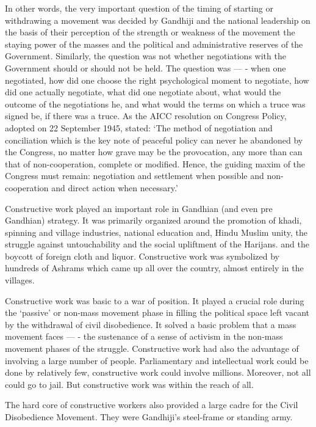 \begin{multicols}{2}
In other words, the very important question of the timing of starting or withdrawing a movement was decided by Gandhiji and the national leadership on the basis of their perception of the strength or weakness of the movement the staying power of the masses and the political and administrative reserves of the Government. Similarly, the question was not whether negotiations with the Government should or should not be held. The question was --- - when one negotiated, how did one choose the right psychological moment to negotiate, how did one actually negotiate, what did one negotiate about, what would the outcome of the negotiations he, and what would the terms on which a truce was signed be, if there was a truce. As the AICC resolution on Congress Policy, adopted on 22 September 1945, stated: `The method of negotiation and conciliation which is the key note of peaceful policy can never he abandoned by the Congress, no matter how grave may be the provocation, any more than can that of non-cooperation, complete or modified. Hence, the guiding maxim of the Congress must remain: negotiation and settlement when possible and non-cooperation and direct action when necessary.'

Constructive work played an important role in Gandhian (and even pre Gandhian) strategy. It was primarily organized around the promotion of khadi, spinning and village industries, national education and, Hindu Muslim unity, the struggle against untouchability and the social upliftment of the Harijans. and the boycott of foreign cloth and liquor. Constructive work was symbolized by hundreds of Ashrams which came up all over the country, almost entirely in the villages.

Constructive work was basic to a war of position. It played a crucial role during the `passive' or non-mass movement phase in filling the political space left vacant by the withdrawal of civil disobedience. It solved a basic problem that a mass movement faces --- - the sustenance of a sense of activism in the non-mass movement phases of the struggle. Constructive work had also the advantage of involving a large number of people. Parliamentary and intellectual work could be done by relatively few, constructive work could involve millions. Moreover, not all could go to jail. But constructive work was within the reach of all.

The hard core of constructive workers also provided a large cadre for the Civil Disobedience Movement. They were Gandhiji's steel-frame or standing army.


\end{multicols}
